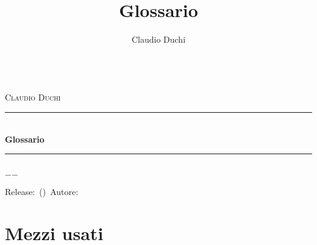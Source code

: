 \documentclass[a4paper,oneside]{book}%
\title{Glossario}
\author{Claudio Duchi}
\date{\datetime}
\makeatletter
\newcommand{\HRule}{\rule{\linewidth}{0.5mm}}
\renewcommand\frontmatter{%
 	\cleardoublepage
 	\@mainmatterfalse
 }
\renewcommand\mainmatter{%
 	\cleardoublepage
 	\@mainmattertrue
 }
\makeatother
\begin{document}
		\frontmatter
		\hypersetup{pageanchor=false}
		\begin{titlepage}\parindent=0pt
			\centering
	\begin{center}
	\Lgrandedue\\[1cm]
	\textsc{\LARGE Claudio Duchi}\\[1.2cm]
	\HRule \\[0.4cm]
	{ \huge \bfseries Glossario}\\[0.4cm]
	\HRule \\[1.2cm]
	\vfill
	{\large $-$\DTMnow$-$}	
\end{center}
{\centering
	Release:\gitReln\ (\gitAbbrevHash)\ Autore:\gitAuthorName\ 
	\gitCommitterDate \\
}
		\end{titlepage}

\frontmatter
		\CDcopyright
		\tableofcontents
			\mainmatter
\cleardoublepage
\glsaddall	
\twocolumn
\printglossaries
\onecolumn		
\nocite{*}
\printbibliography
\appendix
\chapter{Mezzi usati}
\CDMezziUsati
\end{document}
